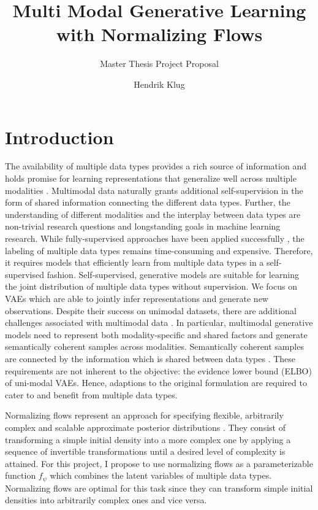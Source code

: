 \documentclass[english]{scrartcl}
\title{Multi Modal Generative Learning with Normalizing Flows}
\subtitle{Master Thesis Project Proposal}
\author{Hendrik Klug}
\begin{document}
    \maketitle


    \section{Introduction}
    The availability of multiple data types provides a rich source of information and holds promise for learning representations that generalize well across multiple modalities \parencite{baltrusaitis_multimodal_2019}.
    Multimodal data naturally grants additional self-supervision in the form of shared information connecting the different data types.
    Further, the understanding of different modalities and the interplay between data types are non-trivial research questions and longstanding goals in machine learning research.
    While fully-supervised approaches have been applied successfully \parencite{karpathy_deep_2015,tsai_learning_2018}, the labeling of multiple data types remains time-consuming and expensive.
    Therefore, it requires models that efficiently learn from multiple data types in a self-supervised fashion.
    Self-supervised, generative models are suitable for learning the joint distribution of multiple data types without supervision.
    We focus on VAEs \parencite{kingma_auto-encoding_2014,rezende_stochastic_2014} which are able to jointly infer representations and generate new observations.
    Despite their success on unimodal datasets, there are additional challenges associated with multimodal data \parencite{suzuki_joint_2016, vedantam_generative_2018}.
    In particular, multimodal generative models need to represent both modality-specific and shared factors and generate semantically coherent samples across modalities.
    Semantically coherent samples are connected by the information which is shared between data types \parencite{shi_variational_2019}.
    These requirements are not inherent to the objective: the evidence lower bound (ELBO) of uni-modal VAEs.
    Hence, adaptions to the original formulation are required to cater to and benefit from multiple data types.

    Normalizing flows represent an approach for specifying flexible, arbitrarily complex and scalable approximate posterior distributions \parencite{papamakarios_normalizing_2019,rezende_variational_2016}.
    They consist of transforming a simple initial density into a more complex one by applying a sequence of invertible transformations until a desired level of complexity is attained.
    For this project, I propose to use normalizing flows as a parameterizable function $f_\psi$ which combines the latent variables of multiple data types.
    Normalizing flows are optimal for this task since they can transform simple initial densities into arbitrarily complex ones and vice versa.
\end{document}
